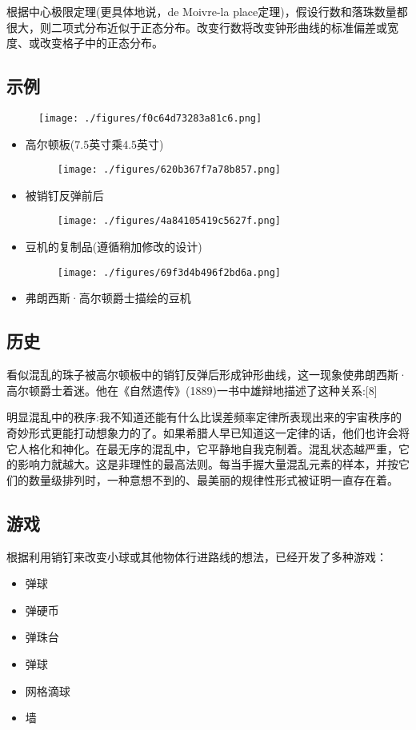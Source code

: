 根据中心极限定理(更具体地说，de Moivre-la place定理)，假设行数和落珠数量都很大，则二项式分布近似于正态分布。改变行数将改变钟形曲线的标准偏差或宽度、或改变格子中的正态分布。

\subsection{示例}

\begin{figure}[ht]
\centering
\texttt{[image: ./figures/f0c64d73283a81c6.png]}
\caption\label{fig_GRDDB_2}
\end{figure}

\begin{itemize}
\item 高尔顿板(7.5英寸乘4.5英寸)

\begin{figure}[ht]
\centering
\texttt{[image: ./figures/620b367f7a78b857.png]}
\caption \label{fig_GRDDB_6}
\end{figure}

\item 被销钉反弹前后
\begin{figure}[ht]
\centering
\texttt{[image: ./figures/4a84105419c5627f.png]}
\caption \label{fig_GRDDB_7}
\end{figure}

\item 豆机的复制品(遵循稍加修改的设计)
\begin{figure}[ht]
\centering
\texttt{[image: ./figures/69f3d4b496f2bd6a.png]}
\caption\label{fig_GRDDB_8}
\end{figure}

\item 弗朗西斯·高尔顿爵士描绘的豆机
\end{itemize}

\subsection{历史}

看似混乱的珠子被高尔顿板中的销钉反弹后形成钟形曲线，这一现象使弗朗西斯·高尔顿爵士着迷。他在《自然遗传》(1889)一书中雄辩地描述了这种关系:[8]

明显混乱中的秩序:我不知道还能有什么比误差频率定律所表现出来的宇宙秩序的奇妙形式更能打动想象力的了。如果希腊人早已知道这一定律的话，他们也许会将它人格化和神化。在最无序的混乱中，它平静地自我克制着。混乱状态越严重，它的影响力就越大。这是非理性的最高法则。每当手握大量混乱元素的样本，并按它们的数量级排列时，一种意想不到的、最美丽的规律性形式被证明一直存在着。

\subsection{游戏}

根据利用销钉来改变小球或其他物体行进路线的想法，已经开发了多种游戏：

\begin{itemize}
\item 弹球
\item 弹硬币
\item 弹珠台
\item 弹球
\item 网格滴球
\item 墙
\end{itemize}
